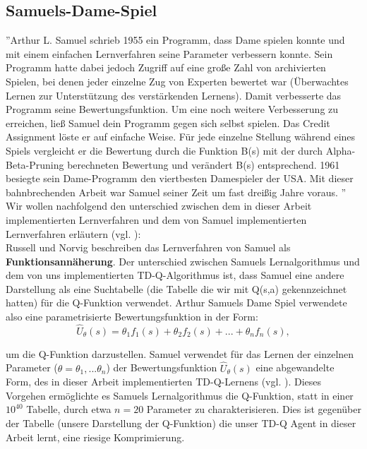 \subsection{Samuels-Dame-Spiel}
''Arthur L. Samuel schrieb 1955 ein Programm, dass Dame spielen konnte und mit einem einfachen Lernverfahren seine Parameter verbessern konnte. Sein Programm hatte dabei jedoch Zugriff auf eine große Zahl von archivierten Spielen, bei denen jeder einzelne Zug von Experten bewertet war (Überwachtes Lernen zur Unterstützung des verstärkenden Lernens). Damit verbesserte das Programm seine Bewertungsfunktion. Um eine noch weitere Verbesserung zu erreichen, ließ Samuel dein Programm gegen sich selbst spielen. Das Credit Assignment löste er auf einfache Weise. Für jede einzelne Stellung während eines Spiels vergleicht er die Bewertung durch die Funktion B(s) mit der durch Alpha-Beta-Pruning berechneten Bewertung und verändert B(s) entsprechend. 1961 besiegte sein Dame-Programm den viertbesten Damespieler der USA. Mit dieser bahnbrechenden Arbeit war Samuel seiner Zeit um fast dreißig Jahre voraus. \cite[120\psq]{Ertel}''\\

Wir wollen nachfolgend den unterschied zwischen dem in dieser Arbeit implementierten Lernverfahren und dem von Samuel implementierten Lernverfahren erläutern (vgl. \cite[976]{Russell}): \\

Russell und Norvig beschreiben das Lernverfahren von Samuel als \textbf{Funktionsannäherung}. Der unterschied zwischen Samuels Lernalgorithmus und dem von uns implementierten TD-Q-Algorithmus ist, dass Samuel eine andere Darstellung als eine Suchtabelle (die Tabelle die wir mit Q(s,a) gekennzeichnet hatten) für die Q-Funktion verwendet. Arthur Samuels Dame Spiel verwendete also eine parametrisierte Bewertungsfunktion in der Form: \\
\begin{equation*}
\hat{U}_\theta(s) = \theta_1 f_1(s) + \theta_2 f_2(s) + ... + \theta_n f_n(s),
\end{equation*}

um die Q-Funktion darzustellen. Samuel verwendet für das Lernen der einzelnen Parameter ($\theta = \theta_1, ... \theta_n$) der Bewertungsfunktion $\hat{U}_\theta(s)$ eine abgewandelte Form, des in dieser Arbeit implementierten TD-Q-Lernens (vgl. \cite[981]{Russell}). Dieses Vorgehen ermöglichte es Samuels Lernalgorithmus die Q-Funktion, statt in einer $10^{40}$ Tabelle, durch etwa $n = 20$ Parameter zu charakterisieren. Dies ist gegenüber der Tabelle (unsere Darstellung der Q-Funktion) die unser TD-Q Agent in dieser Arbeit lernt, eine riesige Komprimierung. \\

